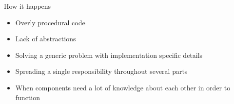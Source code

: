 \documentclass[xcolor=svgnames]{beamer}
\begin{document}



{%
%
\begin{frame}{\subsecname}

    How it happens
    \begin{itemize}
        \pause \item Overly procedural code
        \pause \item Lack of abstractions
        \pause \item Solving a generic problem with implementation specific details
        \pause \item Spreading a single responsibility throughout several parts
        \pause \item When components need a lot of knowledge about each other in
            order to function
    \end{itemize}
\end{frame}
}






\end{document}
